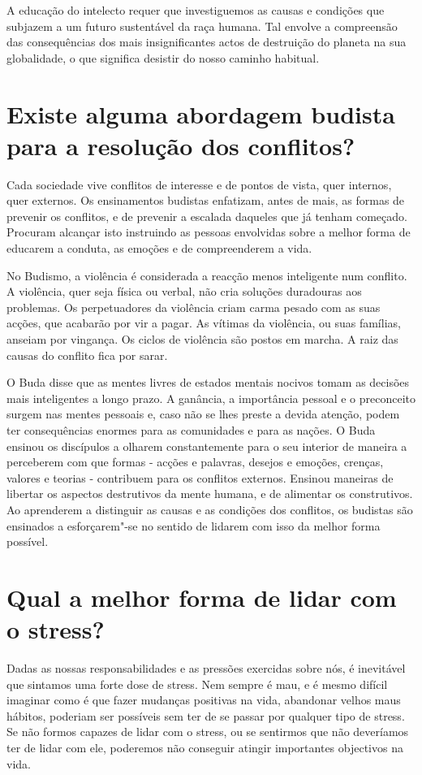 A educação do intelecto requer que investiguemos as causas e condições
que subjazem a um futuro sustentável da raça humana. Tal envolve a
compreensão das consequências dos mais insignificantes actos de
destruição do planeta na sua globalidade, o que significa desistir do
nosso caminho habitual.

\section{Existe alguma abordagem budista para a resolução dos conflitos?}

Cada sociedade vive conflitos de interesse e de pontos de vista, quer
internos, quer externos. Os ensinamentos budistas enfatizam, antes de
mais, as formas de prevenir os conflitos, e de prevenir a escalada
daqueles que já tenham começado. Procuram alcançar isto instruindo as
pessoas envolvidas sobre a melhor forma de educarem a conduta, as
emoções e de compreenderem a vida.

No Budismo, a violência é considerada a reacção menos inteligente num
conflito. A violência, quer seja física ou verbal, não cria soluções
duradouras aos problemas. Os perpetuadores da violência criam carma
pesado com as suas acções, que acabarão por vir a pagar. As vítimas da
violência, ou suas famílias, anseiam por vingança. Os ciclos de
violência são postos em marcha. A raiz das causas do conflito fica por
sarar.

O Buda disse que as mentes livres de estados mentais nocivos tomam as
decisões mais inteligentes a longo prazo. A ganância, a importância
pessoal e o preconceito surgem nas mentes pessoais e, caso não se lhes
preste a devida atenção, podem ter consequências enormes para as
comunidades e para as nações. O Buda ensinou os discípulos a olharem
constantemente para o seu interior de maneira a perceberem com que
formas - acções e palavras, desejos e emoções, crenças, valores e
teorias - contribuem para os conflitos externos. Ensinou maneiras de
libertar os aspectos destrutivos da mente humana, e de alimentar os
construtivos. Ao aprenderem a distinguir as causas e as condições dos
conflitos, os budistas são ensinados a esforçarem"-se no sentido de
lidarem com isso da melhor forma possível.

\section{Qual a melhor forma de lidar com o stress?}

Dadas as nossas responsabilidades e as pressões exercidas sobre nós, é
inevitável que sintamos uma forte dose de stress. Nem sempre é mau, e é
mesmo difícil imaginar como é que fazer mudanças positivas na vida,
abandonar velhos maus hábitos, poderiam ser possíveis sem ter de se
passar por qualquer tipo de stress. Se não formos capazes de lidar com o
stress, ou se sentirmos que não deveríamos ter de lidar com ele,
poderemos não conseguir atingir importantes objectivos na vida.

